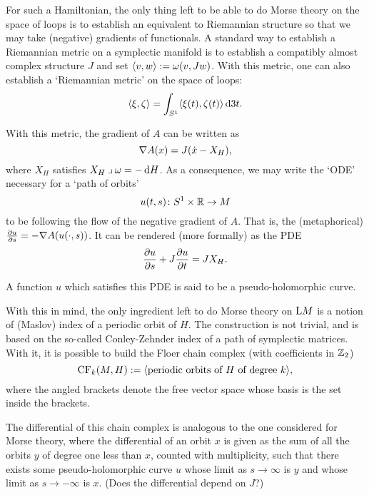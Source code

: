 For such a Hamiltonian, the only thing left to be able to do Morse theory on the space of loops is to establish an equivalent to Riemannian structure so that we may take (negative) gradients of functionals. A standard way to establish a Riemannian metric on a symplectic manifold is to establish a compatibly almost complex structure $J$ and set $\langle v,w\rangle := \omega(v, Jw)$. With this metric, one can also establish a `Riemannian metric' on the space of loops:
\begin{equation}
\braket{\xi, \zeta} = \int_{S^1} \braket{\xi(t), \zeta(t)} \dl3t.
\end{equation}

With this metric, the gradient of $A$ can be written as
\begin{equation}
\nabla A(x) = J(\dot x - X_H),
\end{equation}
where $X_H$ satisfies $X_H \into \omega = - \dl H$. As a consequence, we may write the `ODE' necessary for a `path of orbits'
\begin{equation}
u(t,s) \colon S^1 \times \mathbb{R} \to M
\end{equation}
to be following the flow of the negative gradient of $A$. That is, the (metaphorical) $\diffp u s = - \grad A(u(\cdot, s))$. It can be rendered (more formally) as the PDE
\begin{equation}
\diffp u s + J \diffp u t = J X_H.
\end{equation}

A function $u$ which satisfies this PDE is said to be a pseudo-holomorphic curve.

With this in mind, the only ingredient left to do Morse theory on $\mathrm{L} M$ is a notion of (Maslov) index of a periodic orbit of $H$. The construction is not trivial, and is based on the so-called Conley-Zehnder index of a path of symplectic matrices. With it, it is possible to build the Floer chain complex (with coefficients in $\mathbb{Z}_2$)
\begin{equation}
\mathrm{CF}_k(M, H) := \langle\text{periodic orbits of $H$ of degree $k$}\rangle,
\end{equation}
where the angled brackets denote the free vector space whose basis is the set inside the brackets.

The differential of this chain complex is analogous to the one considered for Morse theory, where the differential of an orbit $x$ is given as the sum of all the orbits $y$ of degree one less than $x$, counted with multiplicity, such that there exists some pseudo-holomorphic curve $u$ whose limit as $s \to \infty$ is $y$ and whose limit as $s \to -\infty$ is $x$. (Does the differential depend on $J$?)

